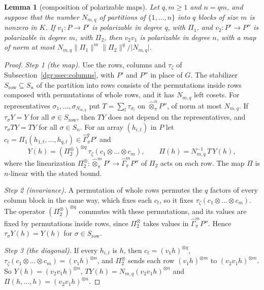 \documentclass[11pt]{amsart}
\newtheorem{lemma}[theorem]{Lemma}
\theoremstyle{definition}
\theoremstyle{remark}
\numberwithin{equation}{section}
\newcommand{\abs}[1]{\lvert #1\rvert}
\newcommand{\norm}[1]{\lVert #1\rVert}
\theoremstyle{plain}
\theoremstyle{definition}
\theoremstyle{plain}
\newcommand{\hGamma}{\widehat\Gamma}
\begin{document}
\begin{lemma}[composition of polarizable maps]\label{dgr:lem:polarizable-composition}
Let $q,m\ge1$ and $n=qm$, and suppose that the number $N_{m,q}$ of partitions of $\{1,\dots,n\}$ into $q$ blocks of size
$m$ is nonzero in $K$. If $v_1\colon P\to P'$ is polarizable in degree $q$, with $\Pi_1$, and $v_2\colon P'\to P''$ is
polarizable in degree $m$, with $\Pi_2$, then $v_2v_1$ is polarizable in degree $n$, with a map of norm at most
$N_{m,q}\norm{\Pi_1}^m\norm{\Pi_2}^q/\abs{N_{m,q}}$.
\end{lemma}

\begin{proof}
\emph{Step 1 (the map).} Use the rows, columns and $\tau_\zeta$ of Subsection~\ref{dgr:ssec:columns}, with $P'$ and
$P''$ in place of $G$. The stabilizer $S_{\mathrm{row}}\subseteq S_n$ of the partition into rows consists of the
permutations inside rows composed with permutations of whole rows, and it has $N_{m,q}$ left cosets. For representatives $\sigma_1,\dots,\sigma_{N_{m,q}}$ put
$T=\sum_l\tau_{\sigma_l}$ on $\widehat\otimes^n_\pi P''$, of norm at most $N_{m,q}$. If $\tau_\sigma Y=Y$ for all
$\sigma\in S_{\mathrm{row}}$, then $TY$ does not depend on the representatives, and $\tau_\sigma TY=TY$ for all
$\sigma\in S_n$. For an array $(h_{i,t})$ in $P$ let $c_t=\Pi_1(h_{1,t},\dots,h_{q,t})\in\hGamma^q_\pi P'$ and
\[
 Y(h)=(\Pi_2^\otimes)^{\otimes q}\,\tau_\zeta(c_1\otimes\dots\otimes c_m),\qquad \Pi(h)=N_{m,q}^{-1}\,T\,Y(h),
\]
where the linearization $\Pi_2^\otimes\colon\widehat\otimes^m_\pi P'\to\hGamma^m_\pi P''$ of $\Pi_2$ acts on each row.
The map $\Pi$ is $n$-linear with the stated bound.

\emph{Step 2 (invariance).} A permutation of whole rows permutes the $q$ factors of every column block in the same way,
which fixes each $c_t$, so it fixes $\tau_\zeta(c_1\otimes\dots\otimes c_m)$. The operator $(\Pi_2^\otimes)^{\otimes q}$
commutes with these permutations, and its values are fixed by permutations inside rows, since $\Pi_2^\otimes$ takes values
in $\hGamma^m_\pi P''$. Hence $\tau_\sigma Y(h)=Y(h)$ for $\sigma\in S_{\mathrm{row}}$.

\emph{Step 3 (the diagonal).} If every $h_{i,t}$ is $h$, then $c_t=(v_1h)^{\otimes q}$,
$\tau_\zeta(c_1\otimes\dots\otimes c_m)=(v_1h)^{\otimes n}$, and $\Pi_2^\otimes$ sends each row $(v_1h)^{\otimes m}$ to
$(v_2v_1h)^{\otimes m}$. So $Y(h)=(v_2v_1h)^{\otimes n}$, $TY(h)=N_{m,q}(v_2v_1h)^{\otimes n}$ and
$\Pi(h,\dots,h)=(v_2v_1h)^{\otimes n}$.


\end{proof}
\end{document}
